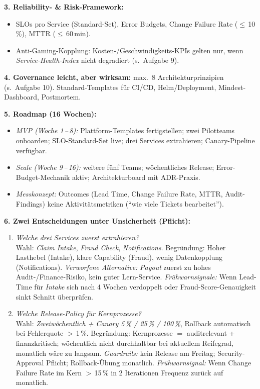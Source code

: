 \documentclass[11pt,a4paper,oneside]{article}
\begin{document}
\begin{loesungbox}
\smallskip
\textbf{3. Reliability- \& Risk-Framework:}
\begin{itemize}
  \item SLOs pro Service (Standard-Set), Error Budgets, Change Failure Rate ($\leq$\,10\,\%), MTTR ($\leq$\,60\,min).
  \item Anti-Gaming-Kopplung: Kosten-/Geschwindigkeits-KPIs gelten nur, wenn \emph{Service-Health-Index} nicht degradiert (s.\ Aufgabe 9).
\end{itemize}

\smallskip
\textbf{4. Governance leicht, aber wirksam:} max.\ 8 Architekturprinzipien (s.\ Aufgabe 10). Standard-Templates f\"ur CI/CD, Helm/Deployment, Mindest-Dashboard, Postmortem.

\smallskip
\textbf{5. Roadmap (16 Wochen):}
\begin{itemize}
  \item \emph{MVP (Woche 1\,--\,8):} Plattform-Templates fertigstellen; zwei Pilotteams onboarden; SLO-Standard-Set live; drei Services extrahieren; Canary-Pipeline verf\"ugbar.
  \item \emph{Scale (Woche 9\,--\,16):} weitere f\"unf Teams; w\"ochentliches Release; Error-Budget-Mechanik aktiv; Architekturboard mit ADR-Praxis.
  \item \emph{Messkonzept:} Outcomes (Lead Time, Change Failure Rate, MTTR, Audit-Findings) \textendash{} keine Aktivit\"atsmetriken (``wie viele Tickets bearbeitet'').
\end{itemize}

\smallskip
\textbf{6. Zwei Entscheidungen unter Unsicherheit (Pflicht):}
\begin{enumerate}
  \item \emph{Welche drei Services zuerst extrahieren?} \\
    Wahl: \emph{Claim Intake}, \emph{Fraud Check}, \emph{Notifications}. Begr\"undung: Hoher Lasthebel (Intake), klare Capability (Fraud), wenig Datenkopplung (Notifications). \emph{Verworfene Alternative:} \emph{Payout} zuerst \textendash{} zu hohes Audit-/Finance-Risiko, kein guter Lern-Service. \emph{Fr\"uhwarnsignale:} Wenn Lead-Time f\"ur \emph{Intake} sich nach 4 Wochen verdoppelt oder Fraud-Score-Genauigkeit sinkt \textrightarrow{} Schnitt \"uberpr\"ufen.
  \item \emph{Welche Release-Policy f\"ur Kernprozesse?} \\
    Wahl: \emph{Zweiw\"ochentlich + Canary 5\,\% / 25\,\% / 100\,\%}, Rollback automatisch bei Fehlerquote $>$\,1\,\%. Begr\"undung: Kernprozesse $=$ auditrelevant + finanzkritisch; w\"ochentlich nicht durchhaltbar bei aktuellem Reifegrad, monatlich w\"are zu langsam. \emph{Guardrails:} kein Release am Freitag; Security-Approval Pflicht; Rollback-\"Ubung monatlich. \emph{Fr\"uhwarnsignal:} Wenn Change Failure Rate im Kern $>$\,15\,\% in 2 Iterationen \textrightarrow{} Frequenz zur\"uck auf monatlich.
\end{enumerate}


\end{loesungbox}
\end{document}
